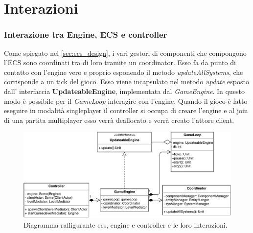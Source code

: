 \section{Interazioni}
\label{sec:interactions_design}

\subsubsection{Interazione tra Engine, ECS e controller}
Come spiegato nel \ref{sec:ecs_design}, i vari gestori di componenti che compongono l'ECS sono coordinati tra di loro tramite un coordinator. Esso fa da punto di contatto con l'engine vero e proprio esponendo il metodo \emph{updateAllSystems}, che corrisponde a un tick del gioco. Esso viene incapsulato nel metodo \emph{update} esposto dall' interfaccia \textbf{UpdateableEngine}, implementata dal \emph{GameEngine}. In questo modo è possibile per il \emph{GameLoop} interagire con l'engine.
Quando il gioco è fatto eseguire in modalità singleplayer il controller si occupa di creare l'engine e al join di una partita multiplayer esso verrà deallocato e verrà creato l'attore client.
\begin{figure}[H]
	\centering
	\includegraphics[width=\columnwidth]{drawio/ECS-engine-controller/ecs-engine-controller.pdf}
	\caption{Diagramma raffigurante ecs, engine e controller e le loro interazioni.}
	\label{fig:ecsenginecontroller}
\end{figure}